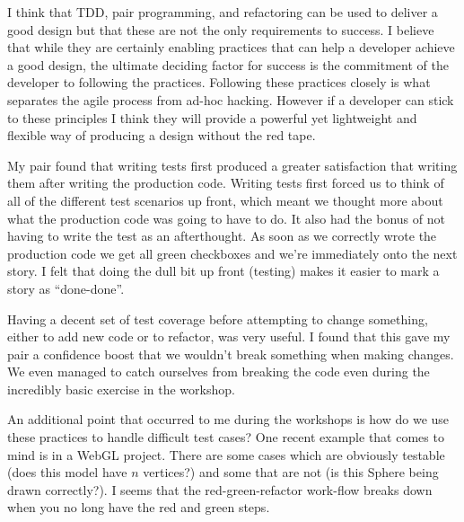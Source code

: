 \documentclass[paper=a4, fontsize=11pt]{scrartcl}	%
\numberwithin{equation}{section}															%
\numberwithin{figure}{section}																%
\numberwithin{table}{section}
\begin{document}
I think that TDD, pair programming, and refactoring can be used to deliver a good design but that these are not the only requirements to success. I believe that while they are certainly enabling practices that can help a developer achieve a good design, the ultimate deciding factor for success is the commitment of the developer to following the practices. Following these practices closely is what separates the agile process from ad-hoc hacking. However if a developer can stick to these principles I think they will provide a powerful yet lightweight and flexible way of producing a design without the red tape.

My pair found that writing tests first produced a greater satisfaction that writing them after writing the production code. Writing tests first forced us to think of all of the different test scenarios up front, which meant we thought more about what the production code was going to have to do. It also had the bonus of not having to write the test as an afterthought. As soon as we correctly wrote the production code we get all green checkboxes and we're immediately onto the next story. I felt that doing the dull bit up front (testing) makes it easier to mark a story as ``done-done''.

Having a decent set of test coverage before attempting to change something, either to add new code or to refactor, was very useful. I found that this gave my pair a confidence boost that we wouldn't break something when making changes. We even managed to catch ourselves from breaking the code even during the incredibly basic exercise in the workshop.

An additional point that occurred to me during the workshops is how do we use these practices to handle difficult test cases? One recent example that comes to mind is in a WebGL project. There are some cases which are obviously testable (does this model have $n$ vertices?) and some that are not (is this Sphere being drawn correctly?). I seems that the red-green-refactor work-flow breaks down when you no long have the red and green steps.

\clearpage


\end{document}
